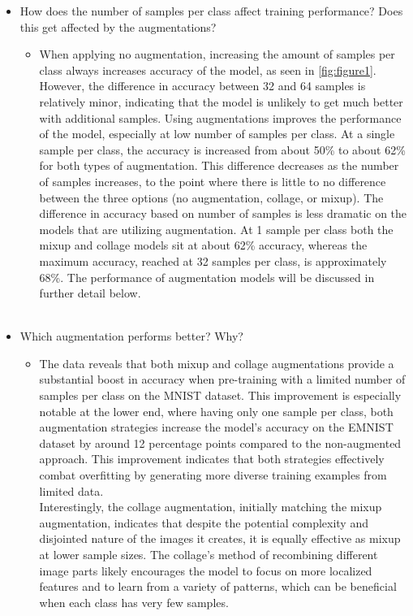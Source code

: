 \documentclass[english,11pt,a4paper,titlepage]{report}
\begin{document}
	\begin{itemize}
		\item How does the number of samples per class affect training performance? Does this get affected by the augmentations?
		\begin{itemize}
			\item When applying no augmentation, increasing the amount of samples per class always increases accuracy of the model, as seen in \ref{fig:figure1}. However, the difference in accuracy between 32 and 64 samples is relatively minor, indicating that the model is unlikely to get much better with additional samples. Using augmentations improves the performance of the model, especially at low number of samples per class. At a single sample per class, the accuracy is increased from about 50\% to about 62\% for both types of augmentation. This difference decreases as the number of samples increases, to the point where there is little to no difference between the three options (no augmentation, collage, or mixup). The difference in accuracy based on number of samples is less dramatic on the models that are utilizing augmentation. At 1 sample per class both the mixup and collage models sit at about 62\% accuracy, whereas the maximum accuracy, reached at 32 samples per class, is approximately 68\%. The performance of augmentation models will be discussed in further detail below.\\
			\\
		\end{itemize}
		\item Which augmentation performs better? Why?
		\begin{itemize}
			\item The data reveals that both mixup and collage augmentations provide a substantial boost in accuracy when pre-training with a limited number of samples per class on the MNIST dataset. This improvement is especially notable at the lower end, where having only one sample per class, both augmentation strategies increase the model's accuracy on the EMNIST dataset by around 12 percentage points compared to the non-augmented approach. This improvement indicates that both strategies effectively combat overfitting by generating more diverse training examples from limited data.\\
			
			Interestingly, the collage augmentation, initially matching the mixup augmentation, indicates that despite the potential complexity and disjointed nature of the images it creates, it is equally effective as mixup at lower sample sizes. The collage's method of recombining different image parts likely encourages the model to focus on more localized features and to learn from a variety of patterns, which can be beneficial when each class has very few samples.\\
			

\end{itemize}
\end{itemize}
\end{document}
